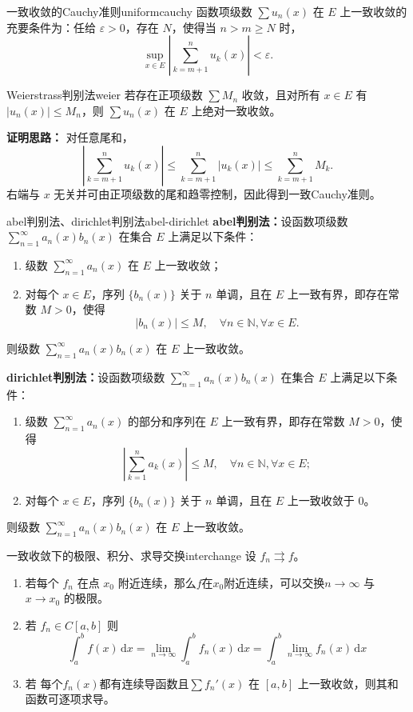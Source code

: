 \documentclass[UTF8,zihao=-4,openany]{ctexbook}
\newcommand{\dd}{\,\mathrm{d}}
\begin{document}
\begin{theorem}{一致收敛的Cauchy准则}{uniformcauchy}
函数项级数 $\sum u_n(x)$ 在 $E$ 上一致收敛的充要条件为：任给 $\varepsilon>0$，存在 $N$，使得当 $n>m\ge N$ 时，
\[
\sup_{x\in E}\left|\sum_{k=m+1}^{n}u_k(x)\right|<\varepsilon.
\]
\end{theorem}

\begin{theorem}{Weierstrass判别法}{weier}
若存在正项级数 $\sum M_n$ 收敛，且对所有 $x\in E$ 有 $|u_n(x)|\le M_n$，则 $\sum u_n(x)$ 在 $E$ 上绝对一致收敛。
\end{theorem}
\noindent\textbf{证明思路：} 对任意尾和，
\[
\left|\sum_{k=m+1}^{n}u_k(x)\right|\le \sum_{k=m+1}^{n}|u_k(x)|\le \sum_{k=m+1}^{n}M_k.
\]
右端与 $x$ 无关并可由正项级数的尾和趋零控制，因此得到一致Cauchy准则。

\begin{theorem}{abel判别法、dirichlet判别法}{abel-dirichlet}
\noindent \textbf{abel判别法：}设函数项级数 $\sum_{n=1}^{\infty} a_n(x) b_n(x)$ 在集合 $E$ 上满足以下条件：

\begin{enumerate}
    \item 级数 $\sum_{n=1}^{\infty} a_n(x)$ 在 $E$ 上一致收敛；
    \item 对每个 $x \in E$，序列 $\{b_n(x)\}$ 关于 $n$ 单调，且在 $E$ 上一致有界，即存在常数 $M > 0$，使得
    \[
    |b_n(x)| \le M, \quad \forall n \in \mathbb{N}, \forall x \in E.
    \]
\end{enumerate}

则级数 $\sum_{n=1}^{\infty} a_n(x) b_n(x)$ 在 $E$ 上一致收敛。\par
\textbf{dirichlet判别法：}设函数项级数 $\sum_{n=1}^{\infty} a_n(x) b_n(x)$ 在集合 $E$ 上满足以下条件：

\begin{enumerate}
    \item 级数 $\sum_{n=1}^{\infty} a_n(x)$ 的部分和序列在 $E$ 上一致有界，即存在常数 $M > 0$，使得
    \[
    \left| \sum_{k=1}^{n} a_k(x) \right| \le M, \quad \forall n \in \mathbb{N}, \forall x \in E;
    \]
    \item 对每个 $x \in E$，序列 $\{b_n(x)\}$ 关于 $n$ 单调，且在 $E$ 上一致收敛于 0。
\end{enumerate}

则级数 $\sum_{n=1}^{\infty} a_n(x) b_n(x)$ 在 $E$ 上一致收敛。


\end{theorem}

\begin{theorem}{一致收敛下的极限、积分、求导交换}{interchange}
设 $f_n\rightrightarrows f$。
\begin{enumerate}
\item 若每个 $f_n$ 在点 $x_0$ 附近连续，那么\(f\)在\(x_0\)附近连续，可以交换$n\to\infty$ 与 $x\to x_0$ 的极限。
\item 若 $f_n\in C[a,b]$ 则
\[
\int_a^b f(x)\dd x=\lim_{n\to\infty}\int_a^b f_n(x)\dd x=\int_{a}^{b}\lim_{n\to\infty}f_n(x)\dd x 
\]
\item 若 每个\(f_n(x)\)都有连续导函数且$\sum f_n'(x)$ 在 $[a,b]$ 上一致收敛，则其和函数可逐项求导。
\end{enumerate}
\end{theorem}
\end{document}
